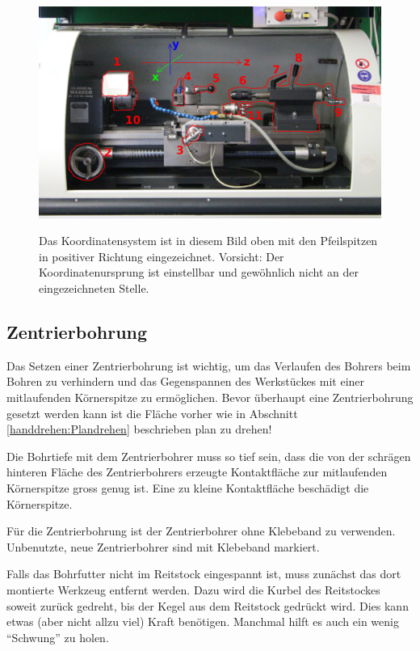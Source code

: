 \documentclass{\basedir/fablab-document}
\begin{document}
\begin{figure}[ht]
\centering
\includegraphics[width = 0.9\linewidth]{img/drehbank-uebersicht-beschreibung} \\
\caption{Das Koordinatensystem ist in diesem Bild oben mit den Pfeilspitzen in positiver Richtung eingezeichnet. Vorsicht: Der Koordinatenursprung ist einstellbar und gewöhnlich nicht an der eingezeichneten Stelle.}
\end{figure}


\subsection{Zentrierbohrung}
\label{handdrehen:zentrierbohrung}
Das Setzen einer Zentrierbohrung ist wichtig, um das Verlaufen des Bohrers beim Bohren zu verhindern
und das Gegenspannen des Werkstückes mit einer mitlaufenden Körnerspitze zu ermöglichen.
Bevor überhaupt eine Zentrierbohrung gesetzt werden kann ist die Fläche vorher wie in
Abschnitt \ref{handdrehen:Plandrehen} beschrieben plan zu drehen!

Die Bohrtiefe mit dem Zentrierbohrer muss so tief sein, dass die von der schrägen hinteren Fläche des Zentrierbohrers erzeugte Kontaktfläche zur mitlaufenden Körnerspitze gross genug ist. Eine zu kleine Kontaktfläche beschädigt die Körnerspitze.

Für die Zentrierbohrung ist der Zentrierbohrer ohne Klebeband zu verwenden.
Unbenutzte, neue Zentrierbohrer sind mit Klebeband markiert.

Falls das Bohrfutter nicht im Reitstock eingespannt ist, muss zunächst das dort montierte Werkzeug entfernt werden.
Dazu wird die Kurbel des Reitstockes soweit zurück gedreht, bis der  Kegel aus dem Reitstock gedrückt wird.
Dies kann etwas (aber nicht allzu viel) Kraft benötigen.
Manchmal hilft es auch ein wenig \enquote{Schwung} zu holen.
\end{document}
